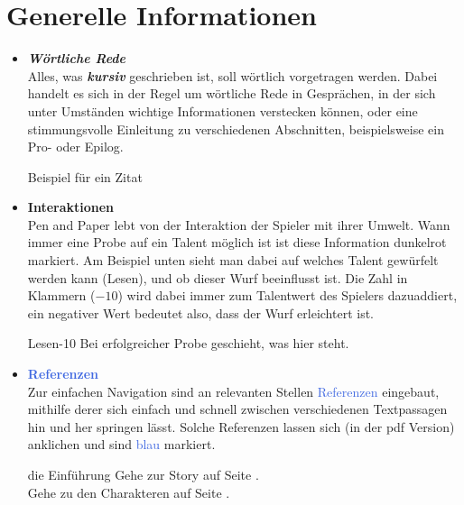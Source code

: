 \thispagestyle{fancy-info}
\section*{Generelle Informationen}

\begin{itemize}
  \item \textbf{\textit{Wörtliche Rede}} \\
  Alles, was \textbf{\textit{kursiv}} geschrieben ist, soll wörtlich vorgetragen werden. Dabei handelt es sich in der Regel
  um wörtliche Rede in Gesprächen, in der sich unter Umständen wichtige Informationen verstecken können, oder eine
  stimmungsvolle Einleitung zu verschiedenen Abschnitten, beispielsweise ein Pro- oder Epilog.

  \begin{say}
  Beispiel für ein Zitat
  \end{say}

  \item \textcolor{RoyalRed}{\textbf{Interaktionen}} \\
  Pen and Paper lebt von der \textcolor{RoyalRed}{Interaktion} der Spieler mit ihrer Umwelt. Wann immer eine Probe auf ein Talent
  möglich ist ist diese Information \textcolor{RoyalRed}{dunkelrot} markiert. Am Beispiel unten sieht man dabei auf welches Talent
  gewürfelt werden kann (Lesen), und ob dieser Wurf beeinflusst ist. Die Zahl in Klammern ($-10$) wird dabei immer zum Talentwert
  des Spielers dazuaddiert, ein negativer Wert bedeutet also, dass der Wurf erleichtert ist.

  \begin{probe}{Lesen}{-10}
  Bei erfolgreicher Probe geschieht, was hier steht.
  \end{probe}
  \vspace{-5pt}

  \item \textcolor{RoyalBlue}{\textbf{Referenzen}} \\
  Zur einfachen Navigation sind an relevanten Stellen \textcolor{RoyalBlue}{Referenzen} eingebaut, mithilfe derer sich einfach und
  schnell zwischen verschiedenen Textpassagen hin und her springen lässt. Solche Referenzen lassen sich (in der pdf
  Version) anklichen und sind \textcolor{RoyalBlue}{blau} markiert.

  \vspace{-5pt}
  \begin{refbox}{die Einführung}
      Gehe zur Story auf Seite \textcolor{RoyalBlue}{\pageref{adv-start}}. \\
      Gehe zu den Charakteren auf Seite \textcolor{RoyalBlue}{\pageref{char-start}}.
  \end{refbox}
  \vspace{-5pt}


\end{itemize}
